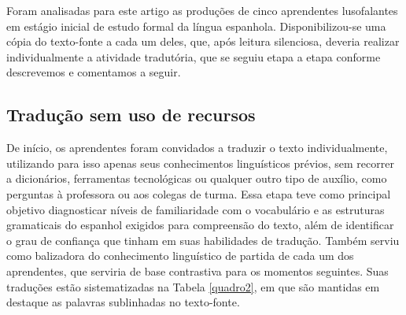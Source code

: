 \documentclass[portuguese]{textolivre}
\begin{document}
Foram analisadas para este artigo as produções de cinco aprendentes lusofalantes em estágio inicial de estudo formal da língua espanhola. Disponibilizou-se uma cópia do texto-fonte a cada um deles, que, após leitura silenciosa, deveria realizar individualmente a atividade tradutória, que se seguiu etapa a etapa conforme descrevemos e comentamos a seguir.

\subsection{Tradução sem uso de recursos}\label{sec-4a}
De início, os aprendentes foram convidados a traduzir o texto individualmente, utilizando para isso apenas seus conhecimentos linguísticos prévios, sem recorrer a dicionários, ferramentas tecnológicas ou qualquer outro tipo de auxílio, como perguntas à professora ou aos colegas de turma. Essa etapa teve como principal objetivo diagnosticar níveis de familiaridade com o vocabulário e as estruturas gramaticais do espanhol exigidos para compreensão do texto, além de identificar o grau de confiança que tinham em suas habilidades de tradução. Também serviu como balizadora do conhecimento linguístico de partida de cada um dos aprendentes, que serviria de base contrastiva para os momentos seguintes. Suas traduções estão sistematizadas na Tabela \ref{quadro2}, em que são mantidas em destaque as palavras sublinhadas no texto-fonte.
\end{document}
